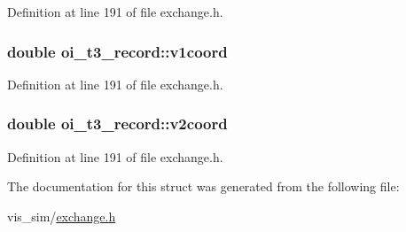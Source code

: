 Definition at line 191 of file exchange.h.

\hypertarget{structoi__t3__record_a2483d954ffd744426f0c34604c5a266c}{
\subsubsection[{v1coord}]{\setlength{\rightskip}{0pt plus 5cm}double {\bf oi\_\-t3\_\-record::v1coord}}}
\label{structoi__t3__record_a2483d954ffd744426f0c34604c5a266c}


Definition at line 191 of file exchange.h.

\hypertarget{structoi__t3__record_ab8343c5dce943c1919169d3ef9c4ac2b}{
\subsubsection[{v2coord}]{\setlength{\rightskip}{0pt plus 5cm}double {\bf oi\_\-t3\_\-record::v2coord}}}
\label{structoi__t3__record_ab8343c5dce943c1919169d3ef9c4ac2b}


Definition at line 191 of file exchange.h.



The documentation for this struct was generated from the following file:\begin{DoxyCompactItemize}
\item 
vis\_\-sim/\hyperlink{exchange_8h}{exchange.h}\end{DoxyCompactItemize}
